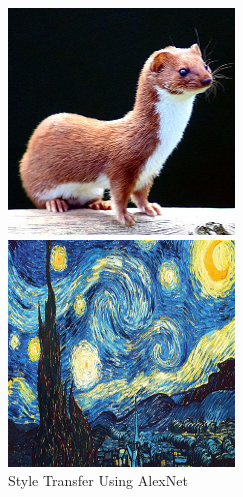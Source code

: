 \documentclass{article}
\begin{document}
\begin{figure}
\centering
\caption{Style Transfer Using AlexNet}
\label{fig:alex-net-transfer}
    \begin{minipage}{0.3\linewidth}
    \includegraphics[width=\textwidth]{img/other-models/alex-net-p}
    \end{minipage}
    \begin{minipage}{0.3\linewidth}
    \includegraphics[width=\textwidth]{img/other-models/alex-net-a}

\end{minipage}
\end{figure}
\end{document}
